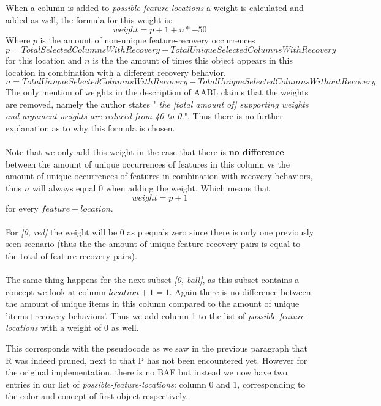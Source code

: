 \documentclass{article}
\begin{document}
\\\\
When a column is added to \textit{possible-feature-locations} a weight is calculated and added as well, the formula for this weight is: 
$$
weight = p + 1 + n * -50
$$
Where $p$ is the amount of non-unique feature-recovery occurrences
$$
p = TotalSelectedColumnsWithRecovery - TotalUniqueSelectedColumnsWithRecovery
$$
for this location and $n$ is the the amount of times this object appears in this location in combination with a different recovery behavior.
$$
n = TotalUniqueSelectedColumnsWithRecovery - TotalUniqueSelectedColumnsWithoutRecovery
$$
The only mention of weights in the description of AABL \cite{ayoobi2023fullthesis} claims that the weights are removed, namely the author states "\textit{ the
[total amount of] supporting weights and argument weights are reduced from 40 to 0.}". Thus there is no further explanation as to why this formula is chosen. 
\\\\
Note that we only add this weight in the case that there is \textbf{no difference} between the amount of unique occurrences of features in this column vs the amount of unique occurrences of features in combination with recovery behaviors, thus $n$ will always equal 0 when adding the weight. Which means that $$
weight = p + 1
$$
for every $feature-location$. 
\\\\
For \textit{[0, red]} the weight will be 0 as p equals zero since there is only one previously seen scenario (thus the the amount of unique feature-recovery pairs is equal to the total of feature-recovery pairs). 
\\\\
The same thing happens for the next subset \textit{[0, ball]}, as this subset contains a concept we look at column $location+1=1$. Again there is no difference between the amount of unique items in this column compared to the amount of unique 'items+recovery behaviors'. Thus we add column 1 to the list of \textit{possible-feature-locations} with a weight of 0 as well.
\begin{quote}
\textit{}
\end{quote}
This corresponds with the pseudocode as we saw in the previous paragraph that R was indeed pruned, next to that P has not been encountered yet. However for the original implementation, there is no BAF but instead we now have two entries in our list of \textit{possible-feature-locations}: column 0 and 1, corresponding to the color and concept of first object respectively. 
\end{document}
